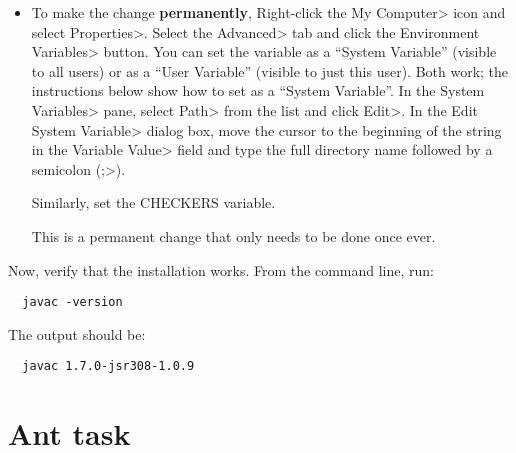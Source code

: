 \begin{enumerate}
\begin{itemize}
\begin{alltt}
path = \emph{newdir};%PATH%
\end{alltt}

For example:

\begin{Verbatim}
path = C:\Program Files\checkers\binary;%PATH%
set CHECKERS = C:\Program Files\checkers
\end{Verbatim}

This is a temporary change that endures until the window is closed, and you
must re-do it every time you start a new command shell.

\item
To make the change \textbf{permanently},
Right-click the \<My Computer> icon and
select \<Properties>. Select the \<Advanced> tab and click the
\<Environment Variables> button. You can set the variable as a ``System
Variable'' (visible to all users) or as a ``User Variable'' (visible to
just this user).  Both work; the instructions below show how to set as a
``System Variable''.
In the \<System Variables> pane, select
\<Path> from the list and click \<Edit>. In the \<Edit System Variable>
dialog box, move the cursor to the beginning of the string in the
\<Variable Value> field and type the full directory name followed by a
semicolon (\<;>).

Similarly, set the CHECKERS variable.

This is a permanent change that only needs to be done once ever.
\end{itemize}



Now, verify that the installation works.  From the command line, run:

\begin{Verbatim}
  javac -version
\end{Verbatim}

The output should be:

\begin{Verbatim}
  javac 1.7.0-jsr308-1.0.9
\end{Verbatim}

\end{enumerate}


\section{Ant task\label{ant-task}}

